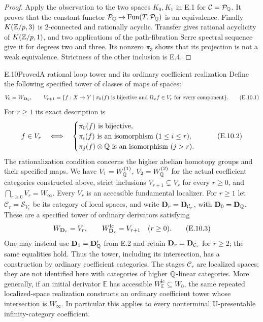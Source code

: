 \begin{proof}
Apply the observation to the two spaces $K_0,K_1$ in E.1 for
$\mathcal C=\mathcal P_\mathbb Q$.  It proves that the constant functor
$\mathcal P_\mathbb Q\to\operatorname{Fun}(T,\mathcal P_\mathbb Q)$ is an equivalence.
Finally $K(\mathbb Z/p,3)$ is 2-connected and rationally acyclic.  Transfer
gives rational acyclicity of $K(\mathbb Z/p,1)$, and two applications of
the path-fibration Serre spectral sequence give it for degrees two
and three.  Its nonzero $\pi_3$ shows that its projection is not a
weak equivalence.  Strictness of the other inclusion is E.4.
\end{proof}

\begin{claim}{E.10}{Proved}{A rational loop tower and its ordinary coefficient realization}
Define the following specified tower of classes of maps of spaces:
\[
 V_0=W_{\mathbf D_\mathbb Q},\qquad
 V_{r+1}=\{f:X\to Y\mid \pi_0(f)\text{ is bijective and }
                \Omega_xf\in V_r\text{ for every component}\}.
                                                               \tag{E.10.1}
\]
For $r\ge1$ its exact description is
\[
 f\in V_r\quad\Longleftrightarrow\quad
 \begin{cases}
 \pi_0(f)\text{ is bijective},\\
 \pi_i(f)\text{ is an isomorphism }(1\le i\le r),\\
 \pi_j(f)\otimes\mathbb Q\text{ is an isomorphism }(j>r).
 \end{cases}                                                \tag{E.10.2}
\]
The rationalization condition concerns the higher abelian homotopy
groups and their specified maps.  We have
$V_1=W_\mathbb Q^{(1)}$, $V_2=W_\mathbb Q^{(2)}$ for the actual coefficient
categories constructed above, strict inclusions
$V_{r+1}\subsetneq V_r$ for every $r\ge0$, and
$\bigcap_{r\ge0}V_r=W_\infty$.
Every $V_r$ is an accessible fundamental localizer. For $r\ge1$
let $\mathcal C_r=\mathcal S_{V_r}$ be its category of local spaces,
and write $\mathbf D_r=\mathbf D_{\mathcal C_r}$, with $\mathbf D_0=\mathbf D_\mathbb Q$.
These are a specified tower of ordinary derivators satisfying
\[
                  W_{\mathbf D_r}=V_r,
       \qquad W_{\mathbf D_r}^{\mathrm{lc}}=V_{r+1}
       \quad(r\ge0).
 \tag{E.10.3}
\]
One may instead use $\mathbf D_1=\mathbf D'_\mathbb Q$ from E.2 and retain
$\mathbf D_r=\mathbf D_{\mathcal C_r}$ for $r\ge2$; the same equalities hold.
Thus the tower, including its intersection, has a construction by
ordinary coefficient categories. The stages $\mathcal C_r$ are
localized spaces; they are not identified here with categories of
higher $\mathbb Q$-linear categories.
More generally, if an initial derivator $\mathbb E$ has accessible
$W_{\mathbb E}^{\mathrm{lc}}\subseteq W_0$, the same repeated
localized-space realization constructs an ordinary coefficient
tower whose intersection is $W_\infty$. In particular this applies
to every nonterminal $\mathbb U$-presentable infinity-category coefficient.
\end{claim}

